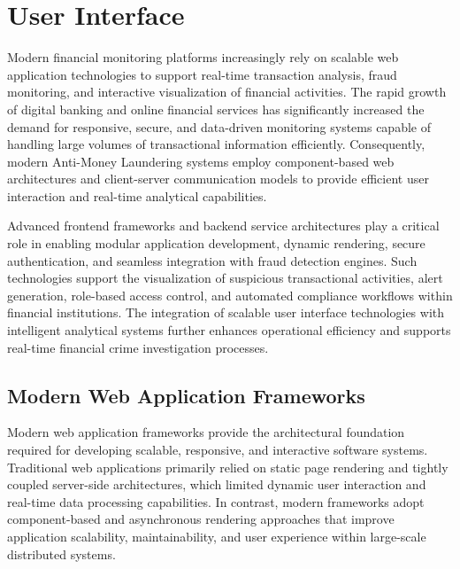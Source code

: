 \section{User Interface}

Modern financial monitoring platforms increasingly rely on scalable web application technologies to support real-time transaction analysis, fraud monitoring, and interactive visualization of financial activities. The rapid growth of digital banking and online financial services has significantly increased the demand for responsive, secure, and data-driven monitoring systems capable of handling large volumes of transactional information efficiently. Consequently, modern Anti-Money Laundering systems employ component-based web architectures and client-server communication models to provide efficient user interaction and real-time analytical capabilities.

Advanced frontend frameworks and backend service architectures play a critical role in enabling modular application development, dynamic rendering, secure authentication, and seamless integration with fraud detection engines. Such technologies support the visualization of suspicious transactional activities, alert generation, role-based access control, and automated compliance workflows within financial institutions. The integration of scalable user interface technologies with intelligent analytical systems further enhances operational efficiency and supports real-time financial crime investigation processes.

\subsection[Modern Web Application Frameworks]{\textbf{Modern Web Application Frameworks}}

Modern web application frameworks provide the architectural foundation required for developing scalable, responsive, and interactive software systems. Traditional web applications primarily relied on static page rendering and tightly coupled server-side architectures, which limited dynamic user interaction and real-time data processing capabilities. In contrast, modern frameworks adopt component-based and asynchronous rendering approaches that improve application scalability, maintainability, and user experience within large-scale distributed systems.

